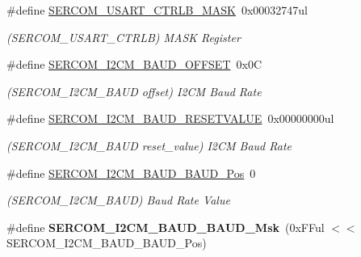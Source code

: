 \begin{DoxyCompactItemize}
\item 
\hypertarget{group___s_a_m_l21___s_e_r_c_o_m_ga239afcaac25026375f3f8abd0a9aa5e7}{}\#define \hyperlink{group___s_a_m_l21___s_e_r_c_o_m_ga239afcaac25026375f3f8abd0a9aa5e7}{S\+E\+R\+C\+O\+M\+\_\+\+U\+S\+A\+R\+T\+\_\+\+C\+T\+R\+L\+B\+\_\+\+M\+A\+S\+K}~0x00032747ul\label{group___s_a_m_l21___s_e_r_c_o_m_ga239afcaac25026375f3f8abd0a9aa5e7}

\begin{DoxyCompactList}\small\item\em (S\+E\+R\+C\+O\+M\+\_\+\+U\+S\+A\+R\+T\+\_\+\+C\+T\+R\+L\+B) M\+A\+S\+K Register \end{DoxyCompactList}\item 
\hypertarget{group___s_a_m_l21___s_e_r_c_o_m_ga569ff4cf09b3100337fba989db51d445}{}\#define \hyperlink{group___s_a_m_l21___s_e_r_c_o_m_ga569ff4cf09b3100337fba989db51d445}{S\+E\+R\+C\+O\+M\+\_\+\+I2\+C\+M\+\_\+\+B\+A\+U\+D\+\_\+\+O\+F\+F\+S\+E\+T}~0x0\+C\label{group___s_a_m_l21___s_e_r_c_o_m_ga569ff4cf09b3100337fba989db51d445}

\begin{DoxyCompactList}\small\item\em (S\+E\+R\+C\+O\+M\+\_\+\+I2\+C\+M\+\_\+\+B\+A\+U\+D offset) I2\+C\+M Baud Rate \end{DoxyCompactList}\item 
\hypertarget{group___s_a_m_l21___s_e_r_c_o_m_ga4470b65fe77552a879850b70648130f9}{}\#define \hyperlink{group___s_a_m_l21___s_e_r_c_o_m_ga4470b65fe77552a879850b70648130f9}{S\+E\+R\+C\+O\+M\+\_\+\+I2\+C\+M\+\_\+\+B\+A\+U\+D\+\_\+\+R\+E\+S\+E\+T\+V\+A\+L\+U\+E}~0x00000000ul\label{group___s_a_m_l21___s_e_r_c_o_m_ga4470b65fe77552a879850b70648130f9}

\begin{DoxyCompactList}\small\item\em (S\+E\+R\+C\+O\+M\+\_\+\+I2\+C\+M\+\_\+\+B\+A\+U\+D reset\+\_\+value) I2\+C\+M Baud Rate \end{DoxyCompactList}\item 
\hypertarget{group___s_a_m_l21___s_e_r_c_o_m_gab6a631816c48cd99d04ebb88f7363077}{}\#define \hyperlink{group___s_a_m_l21___s_e_r_c_o_m_gab6a631816c48cd99d04ebb88f7363077}{S\+E\+R\+C\+O\+M\+\_\+\+I2\+C\+M\+\_\+\+B\+A\+U\+D\+\_\+\+B\+A\+U\+D\+\_\+\+Pos}~0\label{group___s_a_m_l21___s_e_r_c_o_m_gab6a631816c48cd99d04ebb88f7363077}

\begin{DoxyCompactList}\small\item\em (S\+E\+R\+C\+O\+M\+\_\+\+I2\+C\+M\+\_\+\+B\+A\+U\+D) Baud Rate Value \end{DoxyCompactList}\item 
\hypertarget{group___s_a_m_l21___s_e_r_c_o_m_ga884bbc52b3fe87e58e49c65ce20e1f2b}{}\#define {\bfseries S\+E\+R\+C\+O\+M\+\_\+\+I2\+C\+M\+\_\+\+B\+A\+U\+D\+\_\+\+B\+A\+U\+D\+\_\+\+Msk}~(0x\+F\+Ful $<$$<$ S\+E\+R\+C\+O\+M\+\_\+\+I2\+C\+M\+\_\+\+B\+A\+U\+D\+\_\+\+B\+A\+U\+D\+\_\+\+Pos)\label{group___s_a_m_l21___s_e_r_c_o_m_ga884bbc52b3fe87e58e49c65ce20e1f2b}


\end{DoxyCompactItemize}
